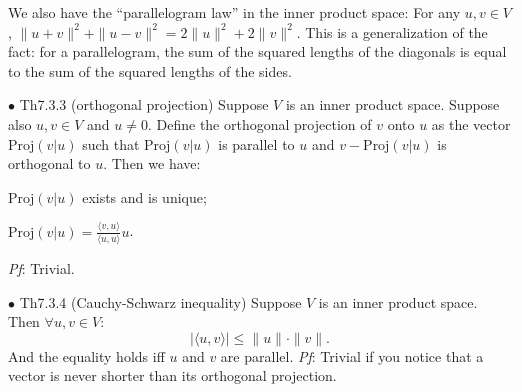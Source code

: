 \documentclass{article}
\begin{document}
\begin{Rmk}{}
    We also have the ``parallelogram law'' in the inner product space: \textcolor{Th}{For any $u, v\in V$, $\|u+v\|^2 + \|u-v\|^2 = 2\|u\|^2 + 2\|v\|^2$.} This is a generalization of the fact: for a parallelogram, the sum of the squared lengths of the diagonals is equal to the sum of the squared lengths of the sides.
\end{Rmk}

\begin{Th}{$\bullet$ Th7.3.3 (orthogonal projection)}
    Suppose $V$ is an inner product space. Suppose also $u, v\in V$ and $u\neq 0$. \textcolor{Df}{Define the orthogonal projection of $v$ onto $u$ as the vector $\text{Proj}(v|u)$ such that $\text{Proj}(v|u)$ is parallel to $u$ and $v-\text{Proj}(v|u)$ is orthogonal to $u$.} Then we have:
    \begin{compactenum}
        \item $\text{Proj}(v|u)$ exists and is unique;
        \item $\text{Proj}(v|u) = \frac{\langle v, u\rangle}{\langle u, u\rangle}u$.
    \end{compactenum}
    \tcblower
    \textit{Pf}: Trivial.
\end{Th}

\begin{Th}{$\bullet$ Th7.3.4 (Cauchy-Schwarz inequality)}
    Suppose $V$ is an inner product space. Then $\forall u, v\in V$: 
    $$|\langle u, v\rangle | \leq \|u\|\cdot \|v\|.$$
    And the equality holds iff $u$ and $v$ are parallel.
    \tcblower
    \textit{Pf}: Trivial if you notice that a vector is never shorter than its orthogonal projection.
\end{Th}
\end{document}
